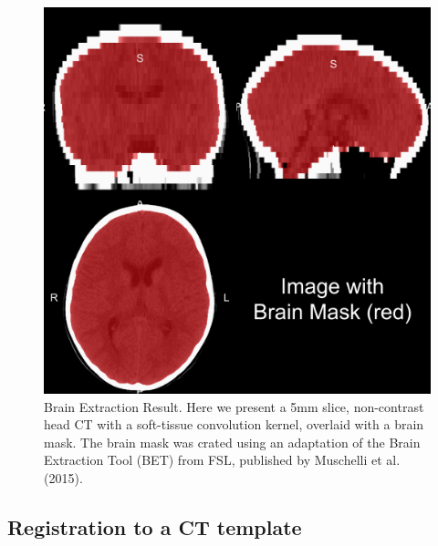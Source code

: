 \documentclass[]{elsarticle} %
\begin{document}
\begin{figure}
\includegraphics[width=1\linewidth]{ss_image} \caption{Brain Extraction Result.  Here we present a 5mm slice, non-contrast head CT with a soft-tissue convolution kernel, overlaid with a brain mask.  The brain mask was crated using an adaptation of the Brain Extraction Tool (BET) from FSL, published by Muschelli et al. (2015).}\label{fig:ss}
\end{figure}

\hypertarget{registration-to-a-ct-template}{%
\subsection{Registration to a CT template}\label{registration-to-a-ct-template}}
\end{document}
